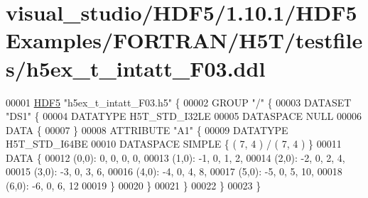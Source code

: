 \hypertarget{visual__studio_2_h_d_f5_21_810_81_2_h_d_f5_examples_2_f_o_r_t_r_a_n_2_h5_t_2testfiles_2h5ex__t__intatt___f03_8ddl_source}{}\section{visual\+\_\+studio/\+H\+D\+F5/1.10.1/\+H\+D\+F5\+Examples/\+F\+O\+R\+T\+R\+A\+N/\+H5\+T/testfiles/h5ex\+\_\+t\+\_\+intatt\+\_\+\+F03.ddl}
\label{visual__studio_2_h_d_f5_21_810_81_2_h_d_f5_examples_2_f_o_r_t_r_a_n_2_h5_t_2testfiles_2h5ex__t__intatt___f03_8ddl_source}

\begin{DoxyCode}
00001 \hyperlink{namespace_h_d_f5}{HDF5} \textcolor{stringliteral}{"h5ex\_t\_intatt\_F03.h5"} \{
00002 GROUP \textcolor{stringliteral}{"/"} \{
00003    DATASET \textcolor{stringliteral}{"DS1"} \{
00004       DATATYPE  H5T\_STD\_I32LE
00005       DATASPACE  NULL
00006       DATA \{
00007       \}
00008       ATTRIBUTE \textcolor{stringliteral}{"A1"} \{
00009          DATATYPE  H5T\_STD\_I64BE
00010          DATASPACE  SIMPLE \{ ( 7, 4 ) / ( 7, 4 ) \}
00011          DATA \{
00012          (0,0): 0, 0, 0, 0,
00013          (1,0): -1, 0, 1, 2,
00014          (2,0): -2, 0, 2, 4,
00015          (3,0): -3, 0, 3, 6,
00016          (4,0): -4, 0, 4, 8,
00017          (5,0): -5, 0, 5, 10,
00018          (6,0): -6, 0, 6, 12
00019          \}
00020       \}
00021    \}
00022 \}
00023 \}
\end{DoxyCode}
